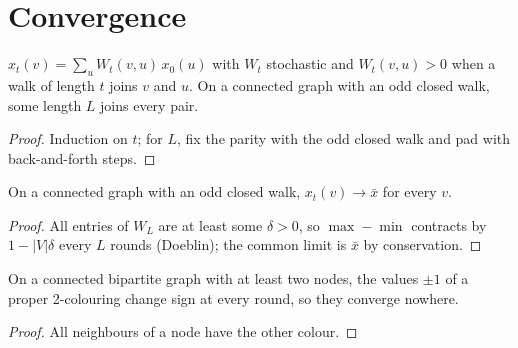 \section{Convergence}
\begin{lemma}\label{lem:walks}
\leanok{}
$x_t(v)=\sum_u W_t(v,u)\,x_0(u)$ with $W_t$ stochastic and $W_t(v,u)>0$ when a walk of length $t$
joins $v$ and $u$. On a connected graph with an odd closed walk, some length $L$ joins every pair.
\end{lemma}
\begin{proof}\leanok
Induction on $t$; for $L$, fix the parity with the odd closed walk and pad with back-and-forth steps.
\end{proof}
\begin{theorem}\label{thm:conv}
\leanok{}
On a connected graph with an odd closed walk, $x_t(v)\to\bar x$ for every $v$.
\end{theorem}
\begin{proof}\leanok
All entries of $W_L$ are at least some $\delta>0$, so $\max-\min$ contracts by $1-|V|\delta$ every
$L$ rounds (Doeblin); the common limit is $\bar x$ by conservation.
\end{proof}
\begin{theorem}\label{thm:bip}
\leanok{}
On a connected bipartite graph with at least two nodes, the values $\pm1$ of a proper
2-colouring change sign at every round, so they converge nowhere.
\end{theorem}
\begin{proof}\leanok
All neighbours of a node have the other colour.
\end{proof}

